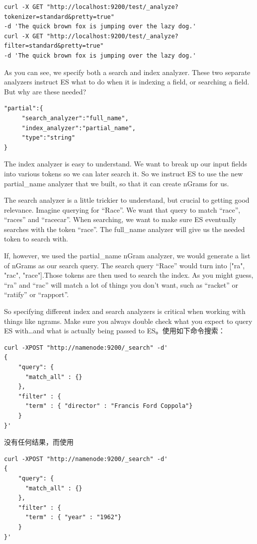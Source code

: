 \begin{verbatim}
curl -X GET "http://localhost:9200/test/_analyze?tokenizer=standard&pretty=true" 
-d 'The quick brown fox is jumping over the lazy dog.'
curl -X GET "http://localhost:9200/test/_analyze?filter=standard&pretty=true" 
-d 'The quick brown fox is jumping over the lazy dog.'
\end{verbatim}
\par As you can see, we specify both a search and index analyzer. These two separate analyzers instruct ES what to do when it is indexing a field, or searching a field. But why are these needed?
\begin{verbatim}
"partial":{
     "search_analyzer":"full_name",
     "index_analyzer":"partial_name",
     "type":"string"
}
\end{verbatim}
\par The index analyzer is easy to understand. We want to break up our input fields into various tokens so we can later search it. So we instruct ES to use the new partial\_name analyzer that we built, so that it can create nGrams for us.
\par The search analyzer is a little trickier to understand, but crucial to getting good relevance. Imagine querying for “Race”. We want that query to match “race”, “races” and “racecar”. When searching, we want to make sure ES eventually searches with the token “race”. The full\_name analyzer will give us the needed token to search with.
\par If, however, we used the partial\_name nGram analyzer, we would generate a list of nGrams as our search query. The search query “Race” would turn into ["ra", "rac", "race"].Those tokens are then used to search the index. As you might guess, “ra” and “rac” will match a lot of things you don’t want, such as “racket” or “ratify” or “rapport”.
\par So specifying different index and search analyzers is critical when working with things like ngrams. Make sure you always double check what you expect to query ES with…and what is actually being passed to ES。使用如下命令搜索：
\begin{verbatim}
curl -XPOST "http://namenode:9200/_search" -d'
{
    "query": {
      "match_all" : {}
    },
    "filter" : {
      "term" : { "director" : "Francis Ford Coppola"}
    }
}'
\end{verbatim}
没有任何结果，而使用
\begin{verbatim}
curl -XPOST "http://namenode:9200/_search" -d'
{
    "query": {
      "match_all" : {}
    },
    "filter" : {
      "term" : { "year" : "1962"}
    }
}'
\end{verbatim}
